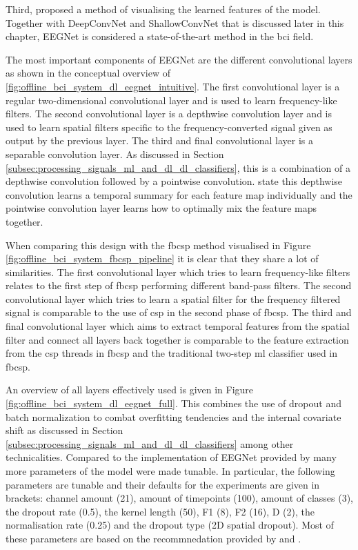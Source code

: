 Third, \citet{eeg_model_eegnet} proposed a method of visualising the learned features of the model.
Together with DeepConvNet and ShallowConvNet that is discussed later in this chapter, EEGNet is considered a state-of-the-art method in the \gls{bci} field.

The most important components of EEGNet are the different convolutional layers as shown in the conceptual overview of \ref{fig:offline_bci_system_dl_eegnet_intuitive}.
The first convolutional layer is a regular two-dimensional convolutional layer and is used to learn frequency-like filters.
The second convolutional layer is a depthwise convolution layer and is used to learn spatial filters specific to the frequency-converted signal given as output by the previous layer.
The third and final convolutional layer is a separable convolution layer.
As discussed in Section \ref{subsec:processing_signals_ml_and_dl_dl_classifiers}, this is a combination of a depthwise convolution followed by a pointwise convolution.
 state this depthwise convolution learns a temporal summary for each feature map individually and the pointwise convolution layer learns how to optimally mix the feature maps together.

When comparing this design with the \gls{fbcsp} method visualised in Figure \ref{fig:offline_bci_system_fbcsp_pipeline} it is clear that they share a lot of similarities.
The first convolutional layer which tries to learn frequency-like filters relates to the first step of \gls{fbcsp} performing different band-pass filters.
The second convolutional layer which tries to learn a spatial filter for the frequency filtered signal is comparable to the use of \gls{csp} in the second phase of \gls{fbcsp}.
The third and final convolutional layer which aims to extract temporal features from the spatial filter and connect all layers back together is comparable to the feature extraction from the \gls{csp} threads in \gls{fbcsp} and the traditional two-step \gls{ml} classifier used in \gls{fbcsp}.

An overview of all layers effectively used is given in Figure \ref{fig:offline_bci_system_dl_eegnet_full}.
This combines the use of dropout and batch normalization to combat overfitting tendencies and the internal covariate shift as discussed in Section \ref{subsec:processing_signals_ml_and_dl_dl_classifiers} among other technicalities.
Compared to the implementation of EEGNet provided by \citet{arl_eegmodels} many more parameters of the model were made tunable.
In particular, the following parameters are tunable and their defaults for the experiments are given in brackets: channel amount (21), amount of timepoints (100), amount of classes (3), the dropout rate (0.5), the kernel length (50), F1 (8), F2 (16), D (2), the normalisation rate (0.25) and the dropout type (2D spatial dropout).
Most of these parameters are based on the recommnedation provided by \citet{eeg_model_eegnet} and \citet{arl_eegmodels}.

